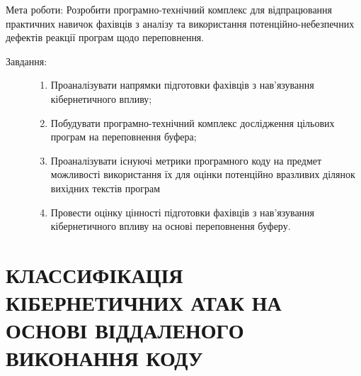 \documentclass[oneside,final,14pt]{extreport}
\begin{document}
Мета роботи: Розробити програмно-технічний комплекс для відпрацювання практичних навичок фахівців з аналізу та використання потенційно-небезпечних дефектів реакції програм щодо переповнення.
\begin{description}
\item[{Завдання:}] \leavevmode\begin{enumerate}
\item {} 
Проаналізувати напрямки підготовки фахівців з нав’язування кібернетичного впливу;

\item {} 
Побудувати програмно-технічний комплекс дослідження цільових програм на переповнення буфера;

\item {} 
Проаналізувати існуючі метрики програмного коду на предмет можливості використання їх для оцінки потенційно вразливих ділянок вихідних текстів програм

\item {} 
Провести оцінку цінності підготовки фахівців з нав’язування кібернетичного впливу на основі переповнення буферу.

\end{enumerate}

\end{description}
\pagebreak

\chapter{КЛАССИФІКАЦІЯ КІБЕРНЕТИЧНИХ АТАК НА ОСНОВІ ВІДДАЛЕНОГО ВИКОНАННЯ КОДУ}
\label{1section::doc}\label{1section:id1}
\end{document}
